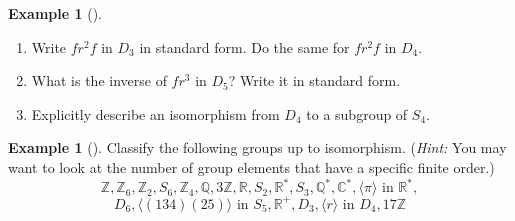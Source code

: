 \documentclass[10pt,openany,oneside]{book}
\theoremstyle{plain}
\theoremstyle{definition}
\theoremstyle{definition}
\theoremstyle{definition}
\newtheorem{example}[theorem]{Example}
\theoremstyle{definition}
\numberwithin{equation}{section}
\def\Z{\mathbb{Z}}
\def\R{\mathbb{R}}
\def\Q{\mathbb{Q}}
\def\C{\mathbb{C}}
\begin{document}
\begin{example}[]\label{example-60}
\leavevmode%
\begin{enumerate}
\item\hypertarget{li-358}{}Write \(fr^2f\) in \(D_3\) in standard form.  Do the same for \(fr^2f\) in \(D_4\).%
\item\hypertarget{li-359}{}What is the inverse of \(fr^3\) in \(D_5\)?  Write it in standard form.%
\item\hypertarget{li-360}{}Explicitly describe an isomorphism from \(D_4\) to a subgroup of \(S_4\).%
\end{enumerate}
%
\end{example}
\begin{example}[]\label{example-61}
Classify the following groups up to isomorphism. (\emph{Hint:} You may want to look at the number of group elements that have a specific finite order.)%
\begin{equation*}
\Z, \Z_6, \Z_2, S_6, \Z_4, \Q, 3\Z, \R, S_2, \R^*, S_3,\Q^*, \C^*, \langle \pi\rangle \text{ in } \R^*,
\end{equation*}
%
\begin{equation*}
D_6,
\langle (134)(25)\rangle \text{ in } S_5, \R^+, D_3, \langle r \rangle \text{ in } D_4, 17\Z
\end{equation*}
%
\end{example}
\typeout{************************************************}
\typeout{************************************************}
\end{document}
